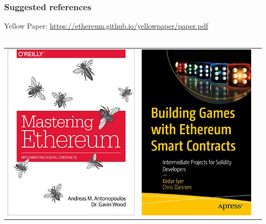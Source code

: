 \documentclass[11pt]{beamer}  %
\begin{document}
\begin{frame}\frametitle{Suggested references}

  \begin{center}
    Yellow Paper: \url{https://ethereum.github.io/yellowpaper/paper.pdf}\\
    \mbox{}\\
    \begin{tabular}{c@{\hskip 1cm}c@{\hskip 1cm}c}
      \includegraphics[scale=.25,clip=false]{pictures/mastering-ethereum.jpg} &
      \includegraphics[scale=.25,clip=false]{pictures/building-games.jpg} &

\end{tabular}
\end{center}
\end{frame}
\end{document}
